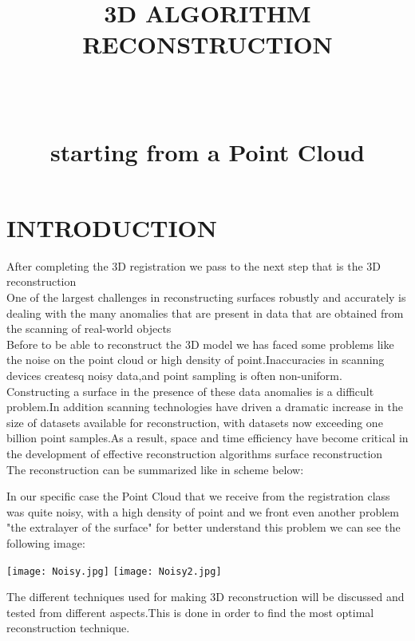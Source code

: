 \documentclass[paper=a4, fontsize=11pt]{scrartcl}	%
\title{ \vspace{-1in} 	\usefont{OT1}{bch}{b}{n}
		\huge \strut 3D ALGORITHM RECONSTRUCTION \strut \\
		\Large \bfseries \strut starting from a Point Cloud \strut
}
\date{}
\numberwithin{equation}{section}															%
\numberwithin{figure}{section}																%
\numberwithin{table}{section}																%
\begin{document}
\maketitle
\section{INTRODUCTION}
After completing the  3D registration we pass to the next step that is the  3D reconstruction\\ 
One of the largest challenges in reconstructing surfaces robustly and accurately
is dealing with the many anomalies that are present in data that are obtained from
the scanning of real-world objects\\
Before to be able to reconstruct the 3D model we has faced some problems like the noise on the point cloud or high density of point.Inaccuracies in scanning devices createsq noisy data,and point sampling is often non-uniform.\\ Constructing a surface in the presence of these data anomalies is a difficult problem.In addition scanning technologies have driven a dramatic increase in the size of datasets available for reconstruction, with datasets now exceeding one billion point samples.As a result, space and time efficiency have become critical in the development of effective reconstruction algorithms surface reconstruction
\\
The reconstruction can be summarized like in scheme below:\\
\vspace{3pt}
\begin{center}
\end{center}
\vspace{3pt}
In our specific case the Point Cloud that we receive from the registration class was quite noisy, with a high density of point and we front even another problem "the extralayer of the surface" for better understand this problem we can see the following image:\\
 \begin{center}
 	
 	\texttt{[image: Noisy.jpg]}
 	\texttt{[image: Noisy2.jpg]}
 	
 \end{center}
The different techniques used for making 3D reconstruction will be discussed and tested from different aspects.This is done in order to find the most optimal reconstruction technique.
 
\end{document}
